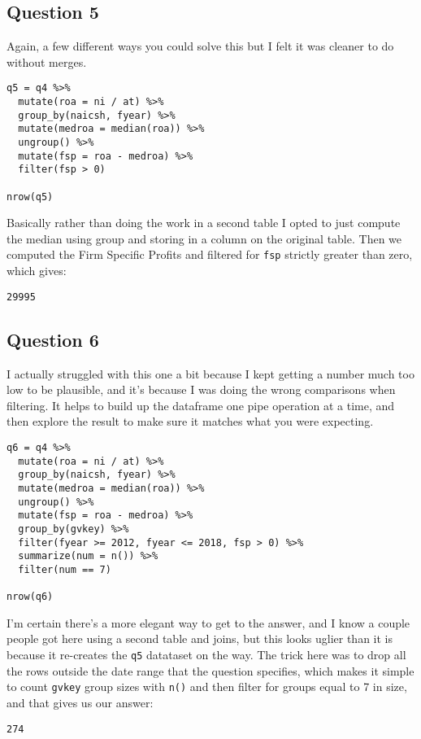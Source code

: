 \documentclass[11pt]{article}
\begin{document}
\subsection*{Question 5}
\label{sec:org397e798}
Again, a few different ways you could solve this but I felt it was cleaner to do without merges.

\begin{verbatim}
q5 = q4 %>%
  mutate(roa = ni / at) %>%
  group_by(naicsh, fyear) %>%
  mutate(medroa = median(roa)) %>%
  ungroup() %>%
  mutate(fsp = roa - medroa) %>%
  filter(fsp > 0)

nrow(q5)
\end{verbatim}

Basically rather than doing the work in a second table I opted to just compute the median using group and storing in a column on the original table.  Then we computed the Firm Specific Profits and filtered for \texttt{fsp} strictly greater than zero, which gives:

\begin{verbatim}
29995
\end{verbatim}

\subsection*{Question 6}
\label{sec:orgc73d380}
I actually struggled with this one a bit because I kept getting a number much too low to be plausible, and it's because I was doing the wrong comparisons when filtering.  It helps to build up the dataframe one pipe operation at a time, and then explore the result to make sure it matches what you were expecting.

\begin{verbatim}
q6 = q4 %>%
  mutate(roa = ni / at) %>%
  group_by(naicsh, fyear) %>%
  mutate(medroa = median(roa)) %>%
  ungroup() %>%
  mutate(fsp = roa - medroa) %>%
  group_by(gvkey) %>%
  filter(fyear >= 2012, fyear <= 2018, fsp > 0) %>%
  summarize(num = n()) %>%
  filter(num == 7)

nrow(q6)
\end{verbatim}

I'm certain there's a more elegant way to get to the answer, and I know a couple people got here using a second table and joins, but this looks uglier than it is because it re-creates the \texttt{q5} datataset on the way.  The trick here was to drop all the rows outside the date range that the question specifies, which makes it simple to count \texttt{gvkey} group sizes with \texttt{n()} and then filter for groups equal to 7 in size, and that gives us our answer:

\begin{verbatim}
274
\end{verbatim}
\end{document}
